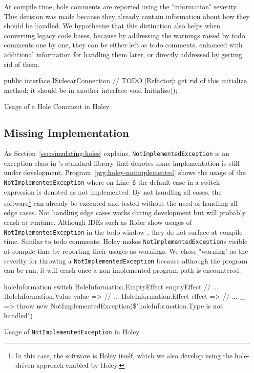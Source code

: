 At compile time, hole comments are reported using the "information" severity.
This decision was made because they already contain information about how they should be handled.
We hypothesize that this distinction also helps when converting legacy code bases, because by addressing the warnings raised by todo comments one by one, they can be either left as todo comments, enhanced with additional information for handling them later, or directly addressed by getting rid of them.

\begin{program}[ht]
\begin{CsCode}
public interface ISidecarConnection
{
	// TODO [Refactor]: get rid of this initialize method; it should be in another interface
	void Initialize();
}
\end{CsCode}
\caption{Usage of a Hole Comment in Holey}
\label{prg:holey-hole-comment}
\end{program}

\subsection{Missing Implementation}
As Section~\ref{sec:simulating-holes} explains, \texttt{NotImplementedException} is an exception class in \CS's standard library that denotes some implementation is still under development.
Program~\ref{prg:holey-notimplemented} shows the usage of the \texttt{NotImplementedException} where on Line~\verb|6| the default case in a switch-expression is denoted as not implemented.
By not handling all cases, the software\footnote{In this case, the software is Holey itself, which we also develop using the hole-driven approach enabled by Holey.} can already be executed and tested without the need of handling all edge cases.
Not handling edge cases works during development but will probably crash at runtime.
Although IDEs such as Rider show usages of \texttt{NotImplementedException} in the todo window \cite{jetbrains_todo_2023}, they do not surface at compile time.
Similar to todo comments, Holey makes \texttt{NotImplementedException}s visible at compile time by reporting their usages as warnings.
We chose "warning" as the severity for throwing a \texttt{NotImplementedException} because although the program can be run, it will crash once a non-implemented program path is encountered.

\begin{program}[ht]
\begin{CsCode}
holeInformation switch
{
	HoleInformation.EmptyEffect emptyEffect // ...
	HoleInformation.Value value => // ...
	HoleInformation.Effect effect => // ...
	_ => throw new NotImplementedException(\$"{holeInformation.Type} is not handled")
}
\end{CsCode}
\caption{Usage of \texttt{NotImplementedException} in Holey}
\label{prg:holey-notimplemented}
\end{program}

